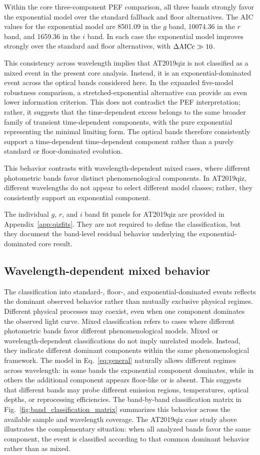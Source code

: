 \documentclass[11pt]{article}
\begin{document}
Within the core three-component PEF comparison, all three bands strongly favor the exponential model over the standard fallback and floor alternatives. The AIC values for the exponential model are 8501.09 in the $g$ band, 10074.36 in the $r$ band, and 1659.36 in the $i$ band. In each case the exponential model improves strongly over the standard and floor alternatives, with $\Delta {\rm AICc}\gg10$.

This consistency across wavelength implies that AT2019qiz is not classified as a mixed event in the present core analysis. Instead, it is an exponential-dominated event across the optical bands considered here. In the expanded five-model robustness comparison, a stretched-exponential alternative can provide an even lower information criterion. This does not contradict the PEF interpretation; rather, it suggests that the time-dependent excess belongs to the same broader family of transient time-dependent components, with the pure exponential representing the minimal limiting form. The optical bands therefore consistently support a time-dependent time-dependent component rather than a purely standard or floor-dominated evolution.

This behavior contrasts with wavelength-dependent mixed cases, where different photometric bands favor distinct phenomenological components. In AT2019qiz, different wavelengths do not appear to select different model classes; rather, they consistently support an exponential component.


The individual $g$, $r$, and $i$ band fit panels for AT2019qiz are provided in Appendix~\ref{app:qizfits}. They are not required to define the classification, but they document the band-level residual behavior underlying the exponential-dominated core result.


\subsection{Wavelength-dependent mixed behavior}
The classification into standard-, floor-, and exponential-dominated events reflects the dominant observed behavior rather than mutually exclusive physical regimes. Different physical processes may coexist, even when one component dominates the observed light curve. Mixed classification refers to cases where different photometric bands favor different phenomenological models. Mixed or wavelength-dependent classifications do not imply unrelated models. Instead, they indicate different dominant components within the same phenomenological framework. The model in Eq.~\ref{eq:general} naturally allows different regimes across wavelength: in some bands the exponential component dominates, while in others the additional component appears floor-like or is absent. This suggests that different bands may probe different emission regions, temperatures, optical depths, or reprocessing efficiencies. The band-by-band classification matrix in Fig.~\ref{fig:band_classification_matrix} summarizes this behavior across the available sample and wavelength coverage. The AT2019qiz case study above illustrates the complementary situation: when all analyzed bands favor the same component, the event is classified according to that common dominant behavior rather than as mixed.
\end{document}
